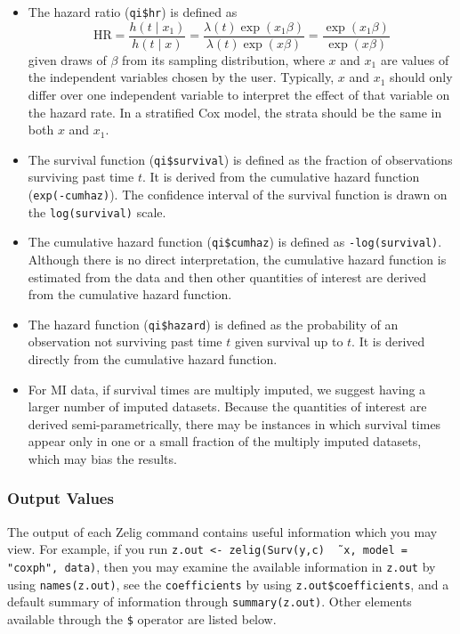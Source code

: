 \begin{itemize}

\item The hazard ratio ({\tt qi\$hr}) is defined as 
\begin{equation*}
\textrm{HR} = \frac{h(t \mid x_1)}{h(t \mid x)} = \frac{\lambda(t) \exp(x_1 \beta)}{\lambda(t) \exp(x \beta)} =  \frac{\exp(x_1 \beta)}{\exp(x \beta)}
\end{equation*}
given draws of $\beta$ from its sampling distribution, where $x$ and $x_1$ are values of the independent variables chosen by the user.  Typically, $x$ and $x_1$ should only differ over one independent variable to interpret the effect of that variable on the hazard rate.  In a stratified Cox model, the strata should be the same in both $x$ and $x_1$.

\item The survival function ({\tt qi\$survival}) is defined as the fraction of observations surviving past time $t$.  It is derived from the cumulative hazard function ({\tt exp(-cumhaz)}).  The confidence interval of the survival function is drawn on the {\tt log(survival)} scale.

\item The cumulative hazard function ({\tt qi\$cumhaz}) is defined as {\tt -log(survival)}.  Although there is no direct interpretation, the cumulative hazard function is estimated from the data and then other quantities of interest are derived from the cumulative hazard function.

\item The hazard function ({\tt qi\$hazard}) is defined as the probability of an observation not surviving past time $t$ given survival up to $t$.  It is derived directly from the cumulative hazard function.

\item For MI data, if survival times are multiply imputed, we suggest having a larger number of imputed datasets.  Because the quantities of interest are derived semi-parametrically, there may be instances in which survival times appear only in one or a small fraction of the multiply imputed datasets, which may bias the results.  
\end{itemize}

\subsubsection{Output Values}

The output of each Zelig command contains useful information which you
may view.  For example, if you run \texttt{z.out <- zelig(Surv(y,c) \~\, x,
  model = "coxph", data)}, then you may examine the available
information in \texttt{z.out} by using \texttt{names(z.out)},
see the {\tt coefficients} by using {\tt z.out\$coefficients}, and
a default summary of information through \texttt{summary(z.out)}.
Other elements available through the {\tt \$} operator are listed
below.

